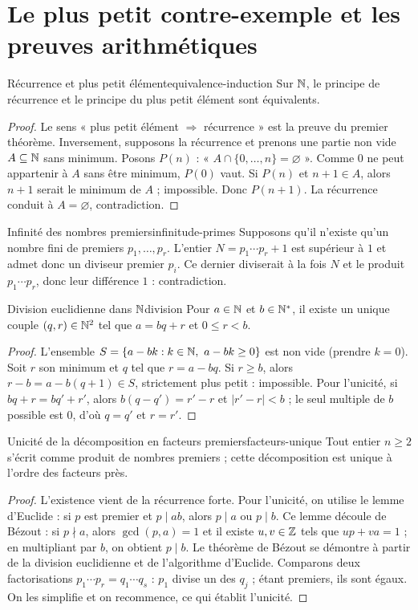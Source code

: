\section{Le plus petit contre-exemple et les preuves arithmétiques}
\begin{proposition}{Récurrence et plus petit élément}{equivalence-induction}
Sur $\mathbb N$, le principe de récurrence et le principe du plus petit élément sont équivalents.
\end{proposition}
\begin{proof}
Le sens « plus petit élément $\Rightarrow$ récurrence » est la preuve du premier théorème. Inversement, supposons la récurrence et prenons une partie non vide $A\subseteq\mathbb N$ sans minimum. Posons $P(n)$ : « $A\cap\{0,\ldots,n\}=\varnothing$ ». Comme $0$ ne peut appartenir à $A$ sans être minimum, $P(0)$ vaut. Si $P(n)$ et $n+1\in A$, alors $n+1$ serait le minimum de $A$ ; impossible. Donc $P(n+1)$. La récurrence conduit à $A=\varnothing$, contradiction.
\end{proof}
\begin{exemple}{Infinité des nombres premiers}{infinitude-primes}
Supposons qu'il n'existe qu'un nombre fini de premiers $p_1,\ldots,p_r$. L'entier $N=p_1\cdots p_r+1$ est supérieur à $1$ et admet donc un diviseur premier $p_i$. Ce dernier diviserait à la fois $N$ et le produit $p_1\cdots p_r$, donc leur différence $1$ : contradiction.
\end{exemple}
\begin{theoreme}{Division euclidienne dans $\mathbb N$}{division}
Pour $a\in\mathbb N$ et $b\in\mathbb N^*$, il existe un unique couple $(q,r)\in\mathbb N^2$ tel que $a=bq+r$ et $0\le r<b$.
\end{theoreme}
\begin{proof}
L'ensemble $S=\{a-bk:k\in\mathbb N,\ a-bk\ge0\}$ est non vide (prendre $k=0$). Soit $r$ son minimum et $q$ tel que $r=a-bq$. Si $r\ge b$, alors $r-b=a-b(q+1)\in S$, strictement plus petit : impossible. Pour l'unicité, si $bq+r=bq'+r'$, alors $b(q-q')=r'-r$ et $|r'-r|<b$ ; le seul multiple de $b$ possible est $0$, d'où $q=q'$ et $r=r'$.
\end{proof}
\begin{theoreme}{Unicité de la décomposition en facteurs premiers}{facteurs-unique}
Tout entier $n\ge2$ s'écrit comme produit de nombres premiers ; cette décomposition est unique à l'ordre des facteurs près.
\end{theoreme}
\begin{proof}
L'existence vient de la récurrence forte. Pour l'unicité, on utilise le lemme d'Euclide : si $p$ est premier et $p\mid ab$, alors $p\mid a$ ou $p\mid b$. Ce lemme découle de Bézout : si $p\nmid a$, alors $\gcd(p,a)=1$ et il existe $u,v\in\mathbb Z$ tels que $up+va=1$ ; en multipliant par $b$, on obtient $p\mid b$. Le théorème de Bézout se démontre à partir de la division euclidienne et de l'algorithme d'Euclide. Comparons deux factorisations $p_1\cdots p_r=q_1\cdots q_s$ : $p_1$ divise un des $q_j$ ; étant premiers, ils sont égaux. On les simplifie et on recommence, ce qui établit l'unicité.
\end{proof}

